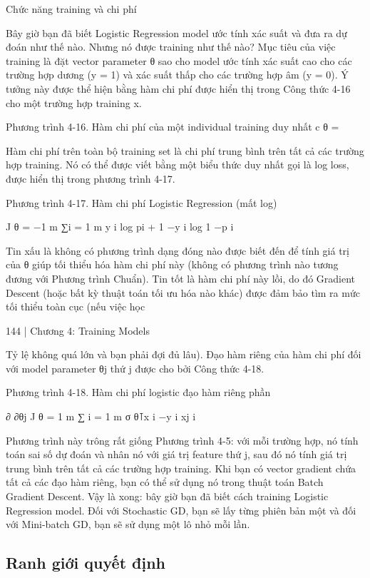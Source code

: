 Chức năng training và chi phí

Bây giờ bạn đã biết Logistic Regression model ước tính xác suất và đưa ra dự đoán như thế nào. Nhưng nó được training như thế nào? Mục tiêu của việc training là đặt vector parameter θ sao cho model ước tính xác suất cao cho các trường hợp dương (y = 1) và xác suất thấp cho các trường hợp âm (y = 0). Ý tưởng này được thể hiện bằng hàm chi phí được hiển thị trong Công thức 4-16 cho một trường hợp training x.

Phương trình 4-16. Hàm chi phí của một individual training duy nhất c θ =

Hàm chi phí trên toàn bộ training set là chi phí trung bình trên tất cả các trường hợp training. Nó có thể được viết bằng một biểu thức duy nhất gọi là log loss, được hiển thị trong phương trình 4-17.

Phương trình 4-17. Hàm chi phí Logistic Regression (mất log)

J θ = −1 m ∑i = 1 m y i log pi + 1 −y i log 1 −p i

Tin xấu là không có phương trình dạng đóng nào được biết đến để tính giá trị của θ giúp tối thiểu hóa hàm chi phí này (không có phương trình nào tương đương với Phương trình Chuẩn). Tin tốt là hàm chi phí này lồi, do đó Gradient Descent (hoặc bất kỳ thuật toán tối ưu hóa nào khác) được đảm bảo tìm ra mức tối thiểu toàn cục (nếu việc học

144 | Chương 4: Training Models

Tỷ lệ không quá lớn và bạn phải đợi đủ lâu). Đạo hàm riêng của hàm chi phí đối với model parameter θj thứ j được cho bởi Công thức 4-18.

Phương trình 4-18. Hàm chi phí logistic đạo hàm riêng phần

∂ ∂θj J θ = 1 m ∑ i = 1 m σ θ⊺x i −y i xj i

Phương trình này trông rất giống Phương trình 4-5: với mỗi trường hợp, nó tính toán sai số dự đoán và nhân nó với giá trị feature thứ j, sau đó nó tính giá trị trung bình trên tất cả các trường hợp training. Khi bạn có vector gradient chứa tất cả các đạo hàm riêng, bạn có thể sử dụng nó trong thuật toán Batch Gradient Descent. Vậy là xong: bây giờ bạn đã biết cách training Logistic Regression model. Đối với Stochastic GD, bạn sẽ lấy từng phiên bản một và đối với Mini-batch GD, bạn sẽ sử dụng một lô nhỏ mỗi lần.

\subsection{Ranh giới quyết định}

